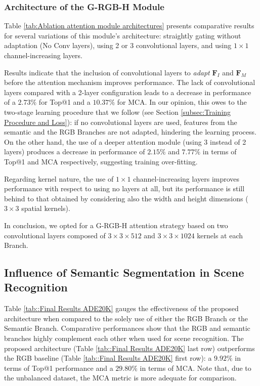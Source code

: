 \documentclass[review, 3p, sort&compress]{elsarticle}
\begin{document}
\subsubsection*{Architecture of the G-RGB-H Module}
Table \ref{tab:Ablation attention module architectures} presents comparative results for several variations of this module's architecture: straightly gating without adaptation (No Conv layers), using 2 or 3 convolutional layers, and using \(1\times1\) channel-increasing layers.

Results indicate that the inclusion of convolutional layers to \textit{adapt} \(\textbf{F}_I\) and \(\textbf{F}_M\) before the attention mechanism improves performance. The lack of convolutional layers compared with a 2-layer configuration leads to a decrease in performance of a \(2.73\%\) for Top@1 and a \(10.37\%\) for MCA. In our opinion, this owes to the two-stage learning procedure that we follow (see Section \ref{subsec:Training Procedure and Loss}): if no convolutional layers are used, features from the semantic and the RGB Branches are not adapted, hindering the learning process. On the other hand, the use of a deeper attention module (using 3 instead of 2 layers) produces a decrease in performance of \(2.15\%\) and \(7.77\%\) in terms of Top@1 and MCA respectively, suggesting training over-fitting. 

Regarding kernel nature, the use of \(1\times1\) channel-increasing layers improves performance with respect to using no layers at all, but its performance is still behind to that obtained by considering also the width and height dimensions (\(3\times3\) spatial kernels). 

In conclusion, we opted for a G-RGB-H attention strategy based on two convolutional layers composed of \(3\times3\times512\) and \(3\times3\times1024\) kernels at each Branch.

\subsection*{Influence of Semantic Segmentation in Scene Recognition}
Table \ref{tab::Final Results ADE20K} gauges the effectiveness of the proposed architecture when compared to the solely use of either the RGB Branch or the Semantic Branch. Comparative performances show that the RGB and semantic branches highly complement each other when used for scene recognition. The proposed architecture (Table \ref{tab::Final Results ADE20K} last row) outperforms the RGB baseline (Table \ref{tab::Final Results ADE20K} first row): a \(9.92 \%\) in terms of Top@1 performance and a \(29.80 \%\) in terms of MCA. Note that, due to the unbalanced dataset, the MCA metric is more adequate for comparison.
\end{document}
